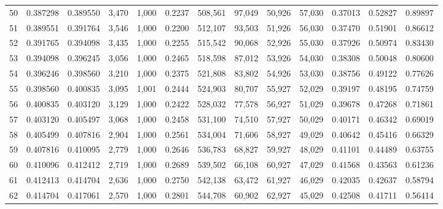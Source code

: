 \begin{tabular}{rrrrrrrrrrrrr}
50  &  0.387298 &  0.389550 &   3,470 &  1,000 &                                     0.2237 &  508,561 &   97,049 &   50,926 &   57,030 &  0.37013 &  0.52827 &  0.89897 \\
51  &  0.389551 &  0.391764 &   3,546 &  1,000 &                                     0.2200 &  512,107 &   93,503 &   51,926 &   56,030 &  0.37470 &  0.51901 &  0.86612 \\
52  &  0.391765 &  0.394098 &   3,435 &  1,000 &                                     0.2255 &  515,542 &   90,068 &   52,926 &   55,030 &  0.37926 &  0.50974 &  0.83430 \\
53  &  0.394098 &  0.396245 &   3,056 &  1,000 &                                     0.2465 &  518,598 &   87,012 &   53,926 &   54,030 &  0.38308 &  0.50048 &  0.80600 \\
54  &  0.396246 &  0.398560 &   3,210 &  1,000 &                                     0.2375 &  521,808 &   83,802 &   54,926 &   53,030 &  0.38756 &  0.49122 &  0.77626 \\
55  &  0.398560 &  0.400835 &   3,095 &  1,001 &                                     0.2444 &  524,903 &   80,707 &   55,927 &   52,029 &  0.39197 &  0.48195 &  0.74759 \\
56  &  0.400835 &  0.403120 &   3,129 &  1,000 &                                     0.2422 &  528,032 &   77,578 &   56,927 &   51,029 &  0.39678 &  0.47268 &  0.71861 \\
57  &  0.403120 &  0.405497 &   3,068 &  1,000 &                                     0.2458 &  531,100 &   74,510 &   57,927 &   50,029 &  0.40171 &  0.46342 &  0.69019 \\
58  &  0.405499 &  0.407816 &   2,904 &  1,000 &                                     0.2561 &  534,004 &   71,606 &   58,927 &   49,029 &  0.40642 &  0.45416 &  0.66329 \\
59  &  0.407816 &  0.410095 &   2,779 &  1,000 &                                     0.2646 &  536,783 &   68,827 &   59,927 &   48,029 &  0.41101 &  0.44489 &  0.63755 \\
60  &  0.410096 &  0.412412 &   2,719 &  1,000 &                                     0.2689 &  539,502 &   66,108 &   60,927 &   47,029 &  0.41568 &  0.43563 &  0.61236 \\
61  &  0.412413 &  0.414704 &   2,636 &  1,000 &                                     0.2750 &  542,138 &   63,472 &   61,927 &   46,029 &  0.42035 &  0.42637 &  0.58794 \\
62  &  0.414704 &  0.417061 &   2,570 &  1,000 &                                     0.2801 &  544,708 &   60,902 &   62,927 &   45,029 &  0.42508 &  0.41711 &  0.56414 \\

\end{tabular}
